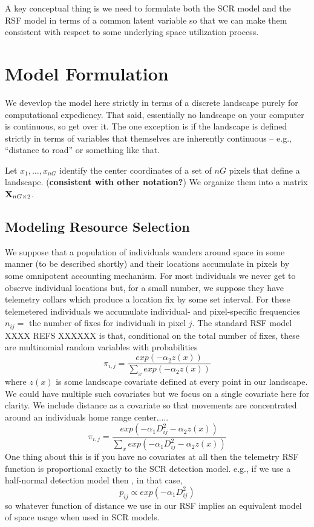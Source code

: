 A key conceptual thing is we need to formulate both the SCR model and
the RSF model in terms of a common latent variable so that we can make
them consistent with respect to some underlying space utilization process.


\section{Model Formulation}

We devevlop the model here strictly in terms of a discrete
landscape purely for computational expediency. That said, 
essentially no landscape on your computer is continuous, so get over
it. The one exception is if the landscape is defined strictly in terms
of variables that themselves are inherently continuous -- e.g.,
``distance to road'' or something like that. 

Let  $x_{1},\ldots,x_{nG}$ identify the center coordinates of a set of
$nG$ pixels that define a landscape. ({\bf consistent with other
  notation?}) We organize them into a matrix ${\bf X}_{nG \times 2}$.

\subsection*{Modeling Resource Selection}

We suppose that a population of individuals wanders around space in
some manner (to be described shortly) and their locations accumulate
in pixels by some omnipotent accounting mechanism. For most
individuals we never get to observe individual locations but, for a
small number, we suppose they have telemetry collars which produce a
location fix by some set interval. For these telemetered individuals
we accumulate individual- and pixel-specific frequencies $n_{ij} = $
the number of fixes for individual$ $i in pixel $j$.  The standard RSF
model XXXX REFS XXXXXX is that, conditional on the total number of
fixes, these are multinomial random variables with probabilities
\[
 \pi_{i,j} = \frac{ exp( -\alpha_{2} z(x) ) }{ \sum_{x} exp(-\alpha_{2} z(x))} 
\]
where $z(x)$ is some landscape covariate defined at every point in our
landscape. We could have multiple such covariates but we focus on a
single covariate here for clarity. 
We include distance as a covariate so that movements are concentrated
around an individuals home range center.....
\[
 \pi_{i,j} = \frac{ exp( -\alpha_{1} D_{ij}^{2} -\alpha_{2} z(x) ) }
{ \sum_{x} exp(-\alpha_{1} D_{ij}^{2} -\alpha_{2} z(x))} 
\]
One thing about this is if you have no covariates at all then
the telemetry RSF function is proportional exactly to the SCR 
detection model. e.g., if 
we use a half-normal detection model then , in that case, 
\[
p_{ij} \propto  exp( -\alpha_{1} D_{ij}^{2})
\]
so whatever function of distance we use in our RSF implies an
equivalent model of space usage when used in SCR models. 







